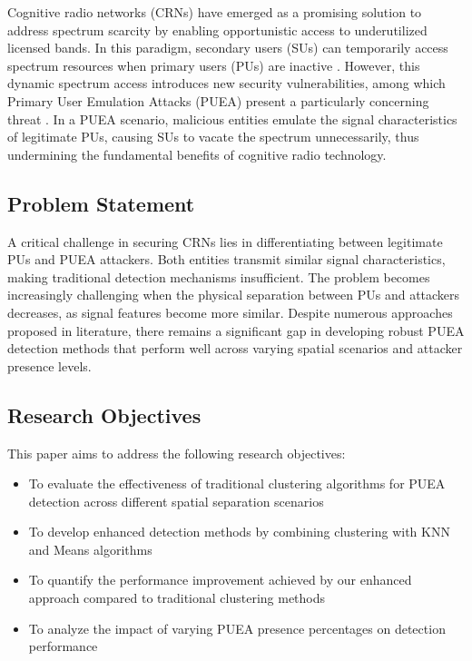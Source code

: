\documentclass[conference]{IEEEtran}
\begin{document}
Cognitive radio networks (CRNs) have emerged as a promising solution to address spectrum scarcity by enabling opportunistic access to underutilized licensed bands. In this paradigm, secondary users (SUs) can temporarily access spectrum resources when primary users (PUs) are inactive \cite{akyildiz2006next}. However, this dynamic spectrum access introduces new security vulnerabilities, among which Primary User Emulation Attacks (PUEA) present a particularly concerning threat \cite{chen2008robust}. In a PUEA scenario, malicious entities emulate the signal characteristics of legitimate PUs, causing SUs to vacate the spectrum unnecessarily, thus undermining the fundamental benefits of cognitive radio technology.

\subsection{Problem Statement}
A critical challenge in securing CRNs lies in differentiating between legitimate PUs and PUEA attackers. Both entities transmit similar signal characteristics, making traditional detection mechanisms insufficient. The problem becomes increasingly challenging when the physical separation between PUs and attackers decreases, as signal features become more similar. Despite numerous approaches proposed in literature, there remains a significant gap in developing robust PUEA detection methods that perform well across varying spatial scenarios and attacker presence levels.

\subsection{Research Objectives}
This paper aims to address the following research objectives:
\begin{itemize}
    \item To evaluate the effectiveness of traditional clustering algorithms for PUEA detection across different spatial separation scenarios
    \item To develop enhanced detection methods by combining clustering with KNN and Means algorithms
    \item To quantify the performance improvement achieved by our enhanced approach compared to traditional clustering methods
    \item To analyze the impact of varying PUEA presence percentages on detection performance
\end{itemize}
\end{document}

